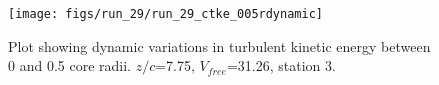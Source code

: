 \begin{figure}[H]
\centering
\texttt{[image: figs/run\_29/run\_29\_ctke\_005rdynamic]}
\caption{Plot showing dynamic variations in turbulent kinetic energy between 0 and 0.5 core radii. $z/c$=7.75, $V_{free}$=31.26, station 3.}
\label{fig:run_29_ctke_005rdynamic}
\end{figure}


